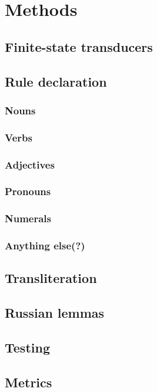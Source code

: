 \section{Methods} \label{methods_section}

\subsection{Finite-state transducers }

\subsection{Rule declaration }
\subsubsection{Nouns}
\subsubsection{Verbs}
\subsubsection{Adjectives}
\subsubsection{Pronouns}
\subsubsection{Numerals}
\subsubsection{Anything else(?)}

\subsection{Transliteration}
\subsection{Russian lemmas }
\subsection{Testing}
\subsection{Metrics} \label{metrics_section}

